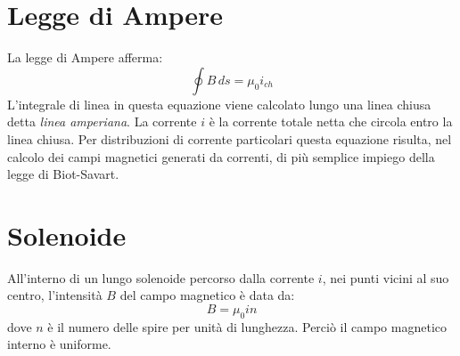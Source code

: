     \section{Legge di Ampere} La legge di Ampere afferma:
        \begin{equation}
            \oint B \, ds = \mu_0i_{ch}
        \end{equation}
    L'integrale di linea in questa equazione viene calcolato lungo una linea
    chiusa detta \textit{linea amperiana}. La corrente $i$ è la corrente totale
    netta che circola entro la linea chiusa. Per distribuzioni di corrente 
    particolari questa equazione risulta, nel calcolo dei campi magnetici 
    generati da correnti, di più semplice impiego della legge di Biot-Savart.

    \section{Solenoide} All'interno di un lungo solenoide percorso dalla 
    corrente $i$, nei punti vicini al suo centro, l'intensità $B$ del campo 
    magnetico è data da:
        \begin{equation}
            B = \mu_0in
        \end{equation}
    dove $n$ è il numero delle spire per unità di lunghezza. Perciò il campo 
    magnetico interno è uniforme.